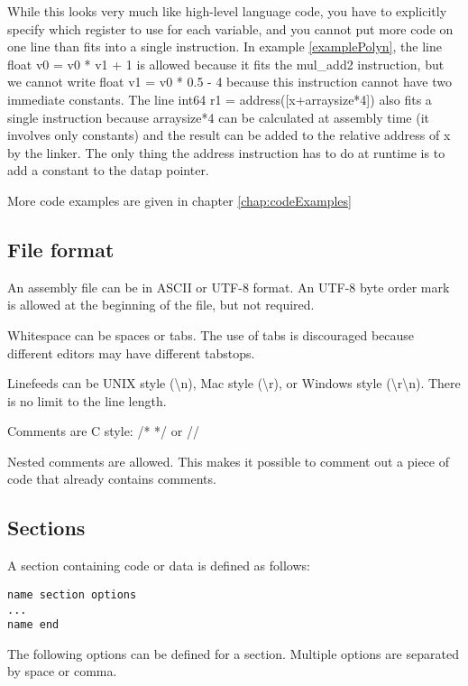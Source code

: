 \documentclass[forwardcom.tex]{subfiles}
\begin{document}
While this looks very much like high-level language code, you have to explicitly specify which register to use for each variable, and you cannot put more code on one line than fits into a single instruction.
In example \ref{examplePolyn}, the line {\ttfamily float v0 = v0 * v1 + 1 } is allowed because it fits the {\ttfamily mul\_add2} instruction, but we cannot write {\ttfamily float v1 = v0 * 0.5 - 4 } because this instruction cannot have two immediate constants.
The line {\ttfamily int64 r1 = address([x+arraysize*4])} also fits a single instruction because 
{\ttfamily arraysize*4} can be calculated at assembly time (it involves only constants) and the result can be added to the relative address of {\ttfamily x} by the linker. The only thing the {\ttfamily address} instruction has to do at runtime is to add a constant to the {\ttfamily datap} pointer.
\vv

More code examples are given in chapter \ref{chap:codeExamples}
\vv


\subsection{File format} \label{assemblyFileFormat}
An assembly file can be in ASCII or UTF-8 format. An UTF-8 byte order mark is allowed at the beginning of the file, but not required.
\vv

Whitespace can be spaces or tabs. The use of tabs is discouraged because different editors may have different tabstops.
\vv

Linefeeds can be UNIX style (\textbackslash n), Mac style (\textbackslash r), or Windows style (\textbackslash r\textbackslash n). There is no limit to the line length.
\vv

Comments are C style:  /* */ or // \\
\vv

Nested comments are allowed. This makes it possible to comment out a piece of code that already contains comments.
\vv


\subsection{Sections} \label{assemblySections}
A section containing code or data is defined as follows:
\begin{lstlisting}[frame=single]
name section options
...
name end
\end{lstlisting}
\vv

The following options can be defined for a section. Multiple options are separated by space or comma.
\end{document}
